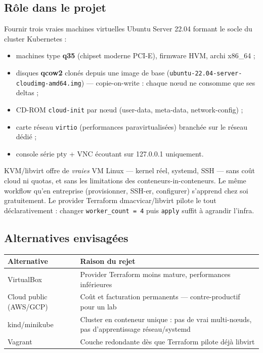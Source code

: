 \documentclass[12pt,a4paper]{article}
\begin{document}
\subsection{Rôle dans le projet}
Fournir trois vraies machines virtuelles Ubuntu Server 22.04 formant le socle du cluster Kubernetes :
\begin{itemize}[itemsep=1pt]
  \item machines type \textbf{q35} (chipset moderne PCI-E), firmware HVM, archi x86\_64 ;
  \item disques \textbf{qcow2} clonés depuis une image de base (\texttt{ubuntu-22.04-server-} \texttt{cloudimg-amd64.img}) --- copie-on-write : chaque nœud ne consomme que ses deltas ;
  \item CD-ROM \texttt{cloud-init} par nœud (user-data, meta-data, network-config) ;
  \item carte réseau \texttt{virtio} (performances paravirtualisées) branchée sur le réseau dédié ;
  \item console série pty + VNC écoutant sur 127.0.0.1 uniquement.
\end{itemize}

\begin{whybox}
KVM/libvirt offre de \emph{vraies} VM Linux --- kernel réel, systemd, SSH --- sans coût cloud ni quotas, et sans les limitations des conteneurs-in-conteneurs. Le même workflow qu'en entreprise (provisionner, SSH-er, configurer) s'apprend chez soi gratuitement. Le provider Terraform dmacvicar/libvirt pilote le tout déclarativement : changer \texttt{worker\_count = 4} puis \texttt{apply} suffit à agrandir l'infra.
\end{whybox}

\subsection{Alternatives envisagées}
\begin{tabular}{@{}lp{10.5cm}@{}}
\toprule
\textbf{Alternative} & \textbf{Raison du rejet} \\
\midrule
VirtualBox & Provider Terraform moins mature, performances inférieures \\
Cloud public (AWS/GCP) & Coût et facturation permanents --- contre-productif pour un lab \\
kind/minikube & Cluster en conteneur unique : pas de vrai multi-nœuds, pas d'apprentissage réseau/systemd \\
Vagrant & Couche redondante dès que Terraform pilote déjà libvirt \\
\bottomrule
\end{tabular}
\end{document}
